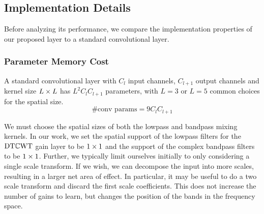\begin{figure}
  \centering
  \newline
  \label{fig:ch6:examples}
\end{figure}


\subsection{Implementation Details}
Before analyzing its performance, we compare the implementation properties of
our proposed layer to a standard convolutional layer.

\subsubsection{Parameter Memory Cost}\label{sec:ch6:memory}
A standard convolutional layer with $C_l$ input channels, $C_{l+1}$ output channels
and kernel size $L\times L$ has $L^2C_{l}C_{l+1}$ parameters, with $L=3$ or $L=5$
common choices for the spatial size.
\begin{equation}
  \text{\#conv params} = 9C_lC_{l+1}
\end{equation}

We must choose the spatial sizes of both the lowpass and bandpass
mixing kernels. In our work, we set the spatial support of the lowpass 
filters for the $\mathrm{DT}\mathbb{C}\mathrm{WT}$ gain layer to be $1\times 1$ and the support of the 
complex bandpass filters to be $1\times 1$.
%
Further, we typically limit ourselves initially to only considering a single scale
transform. If we wish, we can decompose the input into more scales, resulting in a larger
net area of effect. In particular, it may be useful to do a two scale transform and discard 
the first scale coefficients. This does not increase the number of gains to
learn, but changes the position of the bands in the frequency space.

